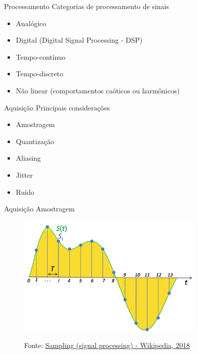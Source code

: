 \documentclass[t]{beamer}
\begin{document}
\begin{frame}{Processamento}
	Categorias de processamento de sinais
	\begin{itemize}
		\item Analógico
		\item Digital (Digital Signal Processing - DSP)
		\item Tempo-contínuo
		\item Tempo-discreto
		\item Não linear (comportamentos caóticos ou harmônicos)
	\end{itemize}
\end{frame}

\begin{frame}{Aquisição}
	Principais considerações
	\begin{itemize}
		\item Amostragem 
		\item Quantização
		\item Aliasing
		\item Jitter
		\item Ruído
	\end{itemize}
\end{frame}

\begin{frame}{Aquisição}
	Amostragem
	\begin{figure}
		\includegraphics[width=0.8\textwidth]{amostragem}
		
		{\scriptsize Fonte: \href{https://en.wikipedia.org/wiki/Sampling_(signal_processing)}{Sampling (signal processing) - Wikipedia, 2018}}
	\end{figure}	
\end{frame}
\end{document}
